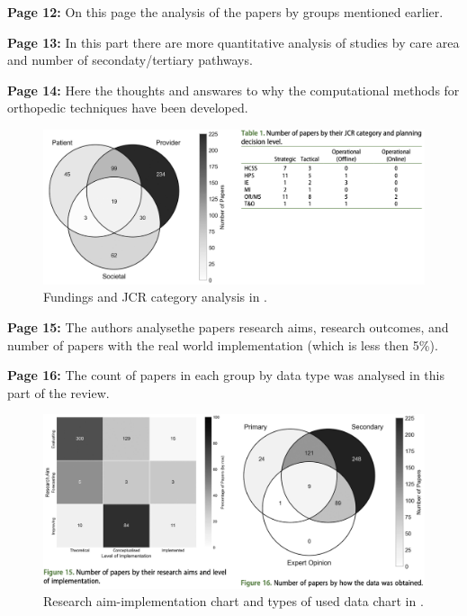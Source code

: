     \textbf{Page 12:}
    On this page the analysis of the papers by groups mentioned earlier.
    
    \textbf{Page 13:}
    In this part there are more quantitative analysis of studies by care area and number of secondaty/tertiary pathways.
    
    \textbf{Page 14:}
    Here the thoughts and answares to why the computational methods for orthopedic techniques have been developed.
    \begin{figure}[H]
        \centering
        \includegraphics[width=1\textwidth]{figures/SR0005GB23/fig4.png}
        \caption{Fundings and JCR category analysis in \cite{x122}.}
        \label{fig4:SR0005GB23}
    \end{figure}

    \textbf{Page 15:}
    The authors analysethe papers research aims, research outcomes, and number of papers with the real world implementation (which is less then 5\%).

    \textbf{Page 16:}
    The count of papers in each group by data type was analysed in this part of the review. 
    \begin{figure}[H]
        \centering
        \includegraphics[width=1\textwidth]{figures/SR0005GB23/fig5.png}
        \caption{Research aim-implementation chart and types of used data chart in \cite{x122}.}
        \label{fig5:SR0005GB23}
    \end{figure}

